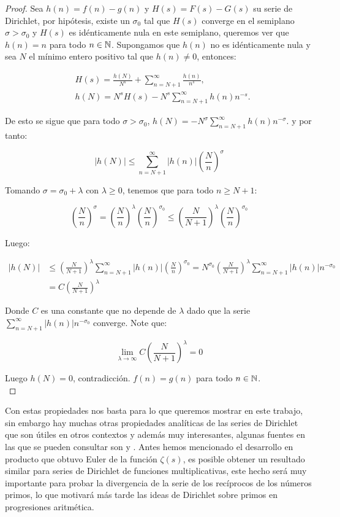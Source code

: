 \begin{proof}
Sea $h(n)=f(n)-g(n)$ y $H(s)=F(s)-G(s)$ su serie de Dirichlet, por hipótesis, existe un $\sigma_0$ tal que $H(s)$ converge en el semiplano $\sigma>\sigma_0$ y $H(s)$ es idénticamente nula en este semiplano, queremos ver que $h(n)=n$ para todo $n\in \mathbb{N}$. Supongamos que $h(n)$ no es idénticamente nula y sea $N$ el mínimo entero positivo tal que $h(n)\neq 0$, entonces:

\begin{align*}
    &H(s)=\frac{h(N)}{N^s}+\sum_{n=N+1}^{\infty} \frac{h(n)}{n^s},\\
    &h(N)=N^s H(s)-N^s \sum_{n=N+1}^{\infty} h(n) n^{-s}
.\end{align*}

De esto se sigue que para todo $\sigma>\sigma_0$, $h(N)=-N^{\sigma}\displaystyle \sum_{n=N+1}^{\infty} h(n) n^{-\sigma}.$ y por tanto:

$$\left|h(N)\right|\leq\sum_{n=N+1}^{\infty} |h(n)|\left(\frac{N}{n}\right)^{\sigma}
    $$

Tomando $\sigma=\sigma_0+\lambda$ con $\lambda\geq 0$, tenemos que para todo $n\geq N+1$:

$$\left(\frac{N}{n}\right)^{\sigma}=\left(\frac{N}{n}\right)^{\lambda}\left(\frac{N}{n}\right)^{\sigma_0}\leq \left(\frac{N}{N+1}\right)^{\lambda}\left(\frac{N}{n}\right)^{\sigma_0}$$

Luego:

$$\begin{aligned}
\left|h(N)\right|&\leq \left(\frac{N}{N+1}\right)^{\lambda}\sum_{n=N+1}^{\infty} |h(n)|\left(\frac{N}{n}\right)^{\sigma_0}=N^{\sigma_0}\left(\frac{N}{N+1}\right)^{\lambda}\sum_{n=N+1}^{\infty} |h(n)|n^{-\sigma_0}\\
&=C\left(\frac{N}{N+1}\right)^{\lambda}
\end{aligned}
    $$

Donde $C$ es una constante que no depende de $\lambda$ dado que la serie $\displaystyle \sum_{n=N+1}^{\infty} |h(n)|n^{-\sigma_0}$ converge. Note que:

$$\lim_{\lambda\to \infty} C\left(\frac{N}{N+1}\right)^{\lambda}=0$$

Luego $h(N)=0$, contradicción. $f(n)=g(n)$ para todo $n\in \mathbb{N}$.\\
\end{proof}

Con estas propiedades nos basta para lo que queremos mostrar en este trabajo, sin embargo hay muchas otras propiedades analíticas de las series de Dirichlet que son útiles en otros contextos y además muy interesantes, algunas fuentes en las que se pueden consultar son \cite{apostol1998introduction} y \cite{montgomery2007multiplicative}. Antes hemos mencionado el desarrollo en producto que obtuvo Euler de la función $\zeta(s)$, es posible obtener un resultado similar para series de Dirichlet de funciones multiplicativas, este hecho será muy importante para probar la divergencia de la serie de los recíprocos de los números primos, lo que motivará más tarde las ideas de Dirichlet sobre primos en progresiones aritmética.


